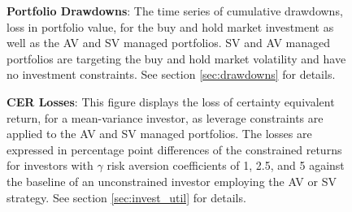 \clearpage
%	
\clearpage
\begin{figure}[!htb]
	\caption{{\bf Portfolio Drawdowns}: The time series of cumulative drawdowns, loss in portfolio value, for the buy and hold market investment as well as the AV and SV managed portfolios. SV and AV managed portfolios are targeting the buy and hold market volatility and have no investment constraints. See section \ref{sec:drawdowns} for details.} \label{fig:fig_drawdowns}
	\vspace{-4mm}
	\begin{adjustbox}{width=\textwidth}
	
	\end{adjustbox}
\end{figure}
\clearpage
\begin{figure}[!htb]
		\caption{{\bf CER Losses}: This figure displays the loss of certainty equivalent return, for a mean-variance investor, as leverage constraints are applied to the AV and SV managed portfolios. The losses are expressed in percentage point differences of the constrained returns for investors with $\gamma$ risk aversion coefficients of 1, 2.5, and 5 against the baseline of an unconstrained investor employing the AV or SV strategy. See section \ref{sec:invest_util} for details.} \label{fig:cer_loss}
		\begin{adjustbox}{width=\textwidth}
			
		\end{adjustbox}
	\end{figure}
\clearpage
\begin{figure}[!htb]
		\caption{{\bf CER Gains}: Certainty Equivalent Return gains for mean variance investors with risk aversion coefficients ranging from 1 to 5 and subject to investment constraints ranging from 1 to 3. These gains are calculated as the CER increase for the investor changing from the SV baseline to the AV investment strategy. See section \ref{sec:invest_util} for details.} \label{fig:cer_gain}
%		
	\begin{subfigure}{\textwidth}
		
	\end{subfigure}
	\begin{subfigure}{\textwidth}
		
	\end{subfigure}
\end{figure}
